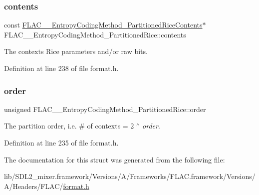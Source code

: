 \subsubsection{\texorpdfstring{contents}{contents}}
{\footnotesize\ttfamily const \mbox{\hyperlink{struct_f_l_a_c_____entropy_coding_method___partitioned_rice_contents}{F\+L\+A\+C\+\_\+\+\_\+\+Entropy\+Coding\+Method\+\_\+\+Partitioned\+Rice\+Contents}}$\ast$ F\+L\+A\+C\+\_\+\+\_\+\+Entropy\+Coding\+Method\+\_\+\+Partitioned\+Rice\+::contents}

The context\textquotesingle{}s Rice parameters and/or raw bits. 

Definition at line 238 of file format.\+h.

\mbox{\label{struct_f_l_a_c_____entropy_coding_method___partitioned_rice_a1e1c9049e31eab5113c245164b2c694a}} 
\subsubsection{\texorpdfstring{order}{order}}
{\footnotesize\ttfamily unsigned F\+L\+A\+C\+\_\+\+\_\+\+Entropy\+Coding\+Method\+\_\+\+Partitioned\+Rice\+::order}

The partition order, i.\+e. \# of contexts = 2 $^\wedge$ {\itshape order}. 

Definition at line 235 of file format.\+h.



The documentation for this struct was generated from the following file\+:\begin{DoxyCompactItemize}
\item 
lib/\+S\+D\+L2\+\_\+mixer.\+framework/\+Versions/\+A/\+Frameworks/\+F\+L\+A\+C.\+framework/\+Versions/\+A/\+Headers/\+F\+L\+A\+C/\mbox{\hyperlink{format_8h}{format.\+h}}\end{DoxyCompactItemize}
